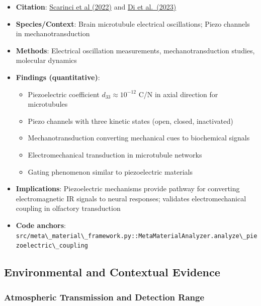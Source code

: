 \documentclass[
  13pt,
  a4paperpaper,
  12pt]{article}
\newcommand{\passthrough}[1]{#1}
\providecommand{\tightlist}{%
  \setlength{\itemsep}{0pt}\setlength{\parskip}{0pt}}
\begin{document}
\begin{itemize}
\tightlist
\item
  \textbf{Citation}:
  \href{https://pmc.ncbi.nlm.nih.gov/articles/PMC11412201/}{Scarinci et
  al (2022)} and
  \href{https://www.nature.com/articles/s41392-023-01501-9}{Di et
  al.~(2023)}
\item
  \textbf{Species/Context}: Brain microtubule electrical oscillations;
  Piezo channels in mechanotransduction
\item
  \textbf{Methods}: Electrical oscillation measurements,
  mechanotransduction studies, molecular dynamics
\item
  \textbf{Findings (quantitative)}:

  \begin{itemize}
  \tightlist
  \item
    Piezoelectric coefficient \(d_{33} \approx 10^{-12}\) C/N in axial
    direction for microtubules
  \item
    Piezo channels with three kinetic states (open, closed, inactivated)
  \item
    Mechanotransduction converting mechanical cues to biochemical
    signals
  \item
    Electromechanical transduction in microtubule networks
  \item
    Gating phenomenon similar to piezoelectric materials
  \end{itemize}
\item
  \textbf{Implications}: Piezoelectric mechanisms provide pathway for
  converting electromagnetic IR signals to neural responses; validates
  electromechanical coupling in olfactory transduction
\item
  \textbf{Code anchors}:
  \passthrough{\lstinline!src/meta\_material\_framework.py::MetaMaterialAnalyzer.analyze\_piezoelectric\_coupling!}
\end{itemize}

\subsection{Environmental and Contextual
Evidence}\label{environmental-and-contextual-evidence}

\subsubsection{Atmospheric Transmission and Detection
Range}\label{atmospheric-transmission-and-detection-range}
\end{document}
